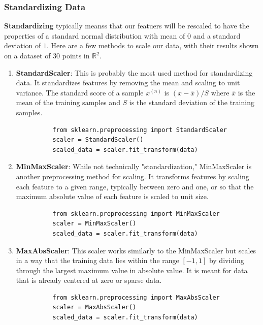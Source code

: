 \documentclass{article}
\begin{document}
    \subsubsection{Standardizing Data}

      \textbf{Standardizing} typically meanss that our featuers will be rescaled to have the properties of a standard normal distribution with mean of $0$ and a standard deviation of $1$. Here are a few methods to scale our data, with their results shown on a dataset of $30$ points in $\mathbb{R}^2$. 
      \begin{enumerate}
          \item \textbf{StandardScaler}: This is probably the most used method for standardizing data. It standardizes features by removing the mean and scaling to unit variance. The standard score of a sample $x^{(n)}$ is $(x - \bar{x})/S$ where $\bar{x}$ is the mean of the training samples and $S$ is the standard deviation of the training samples. 
          \begin{lstlisting}
          from sklearn.preprocessing import StandardScaler
          scaler = StandardScaler()
          scaled_data = scaler.fit_transform(data)
          \end{lstlisting}

          \item \textbf{MinMaxScaler}: While not technically "standardization," MinMaxScaler is another preprocessing method for scaling. It transforms features by scaling each feature to a given range, typically between zero and one, or so that the maximum absolute value of each feature is scaled to unit size. 
          \begin{lstlisting}
          from sklearn.preprocessing import MinMaxScaler
          scaler = MinMaxScaler()
          scaled_data = scaler.fit_transform(data)
          \end{lstlisting}

          \item \textbf{MaxAbsScaler}: This scaler works similarly to the MinMaxScaler but scales in a way that the training data lies within the range $[-1, 1]$ by dividing through the largest maximum value in absolute value. It is meant for data that is already centered at zero or sparse data. 
          \begin{lstlisting}
          from sklearn.preprocessing import MaxAbsScaler
          scaler = MaxAbsScaler()
          scaled_data = scaler.fit_transform(data)
          \end{lstlisting}


\end{enumerate}
\end{document}
